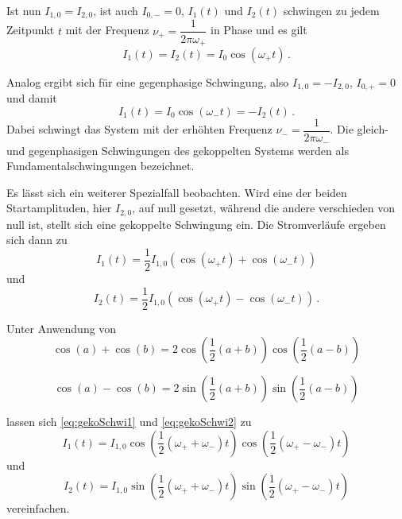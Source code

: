 Ist nun $I_{1,0} = I_{2,0}$, ist auch $I_{0,-} = 0$, $I_1(t)$ und $I_2(t)$ schwingen zu jedem Zeitpunkt $t$ mit der Frequenz $ν_+ = \dfrac{1}{2πω_+}$ in Phase und es gilt
\begin{equation*}
     I_1(t) = I_2(t) = I_0 \cos(ω_+ t)\,.
\end{equation*}

Analog ergibt sich für eine gegenphasige Schwingung, also $I_{1,0} = -I_{2,0}$, $I_{0,+}=0$ und damit
\begin{equation*}
    I_1(t) = I_0 \cos(ω_- t) = -I_2(t)\,.
\end{equation*}
Dabei schwingt das System mit der erhöhten Frequenz $ν_- = \dfrac{1}{2πω_-}$. Die gleich- und gegenphasigen Schwingungen des gekoppelten Systems werden als Fundamentalschwingungen bezeichnet.

Es lässt sich ein weiterer Spezialfall beobachten. Wird eine der beiden Startamplituden, hier $I_{2,0}$, auf null gesetzt, während die andere verschieden von null ist, stellt sich eine gekoppelte Schwingung ein.
Die Stromverläufe ergeben sich dann zu
\begin{equation}
    I_1(t) = \dfrac{1}{2} I_{1,0}(\cos(ω_+ t) + \cos(ω_- t))
    \label{eq:gekoSchwi1}
\end{equation}
und
\begin{equation}
    I_2(t) = \dfrac{1}{2} I_{1,0}(\cos(ω_+ t) - \cos(ω_- t))\,.
    \label{eq:gekoSchwi2}
\end{equation}

Unter Anwendung von
\begin{equation*}
    \cos(a) + \cos(b) = 2 \cos(\dfrac{1}{2}(a+b)) \cos(\dfrac{1}{2}(a-b))
\end{equation*} 

\begin{equation*}
    \cos(a) - \cos(b) = 2 \sin(\dfrac{1}{2}(a+b)) \sin(\dfrac{1}{2}(a-b))
\end{equation*} 

lassen sich \eqref{eq:gekoSchwi1} und \eqref{eq:gekoSchwi2} zu
\begin{equation*}
    I_1(t) = I_{1,0}\cos(\dfrac{1}{2}(ω_+ + ω_-)t) \cos(\dfrac{1}{2}(ω_+ - ω_-)t) 
\end{equation*}
und
\begin{equation*}
    I_2(t) = I_{1,0}\sin(\dfrac{1}{2}(ω_+ + ω_-)t) \sin(\dfrac{1}{2}(ω_+ - ω_-)t)
\end{equation*}
vereinfachen.
